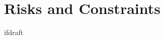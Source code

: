 \documentclass[qipps.tex]{subfiles}
\begin{document}
\section{Risks and Constraints}
ifdraft{
}{}

\end{document}
